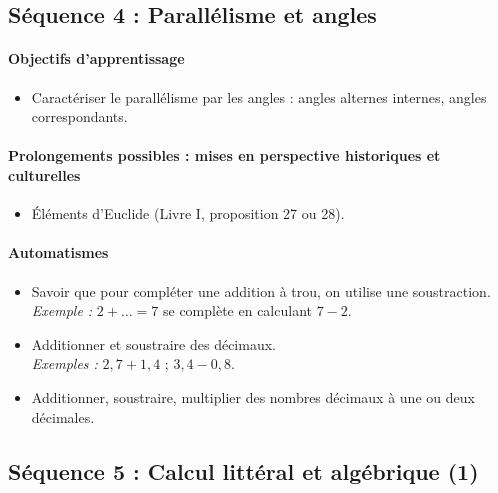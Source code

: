\documentclass[11pt,a4paper]{article}
\begin{document}
\subsection*{Séquence 4 : Parallélisme et angles}

\paragraph{Objectifs d'apprentissage}
\begin{itemize}[label=\bullet]
    \item Caractériser le parallélisme par les angles : angles alternes internes, angles correspondants.
\end{itemize}

\paragraph{Prolongements possibles : mises en perspective historiques et culturelles}
\begin{itemize}[label=\bullet]
    \item Éléments d'Euclide (Livre I, proposition 27 ou 28).
\end{itemize}

\paragraph{Automatismes}
\begin{itemize}[label=\bullet]
    \item Savoir que pour compléter une addition à trou, on utilise une soustraction.\\
    \textit{Exemple :} $2 + \dots = 7$ se complète en calculant $7 - 2$.
    \item Additionner et soustraire des décimaux.\\
    \textit{Exemples :} $2,7 + 1,4$ ; $3,4 - 0,8$.
    \item Additionner, soustraire, multiplier des nombres décimaux à une ou deux décimales.
\end{itemize}


\subsection*{Séquence 5 : Calcul littéral et algébrique (1)}
\end{document}

